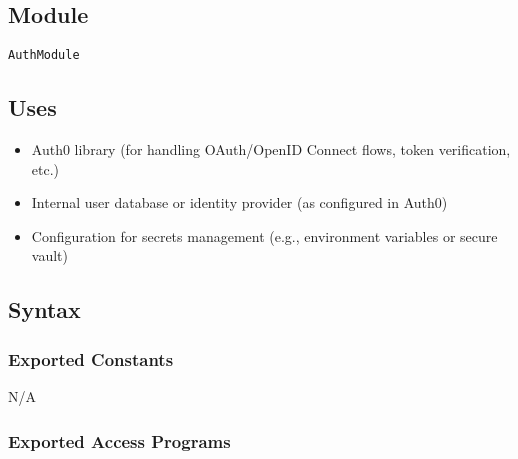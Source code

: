 \documentclass[12pt, titlepage]{article}
\begin{document}
\subsection{Module}

\texttt{AuthModule}

\subsection{Uses}

\begin{itemize}
    \item Auth0 library (for handling OAuth/OpenID Connect flows, token verification, etc.)
    \item Internal user database or identity provider (as configured in Auth0)
    \item Configuration for secrets management (e.g., environment variables or secure vault)
\end{itemize}

\subsection{Syntax}

\subsubsection{Exported Constants}

N/A


\subsubsection{Exported Access Programs}

\end{document}

